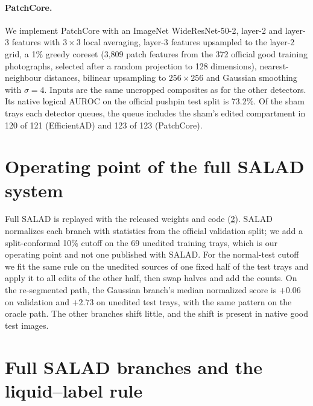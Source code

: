 \paragraph{PatchCore.} We implement PatchCore \cite{roth2022} with an ImageNet WideResNet-50-2, layer-2 and layer-3 features with $3{\times}3$ local averaging, layer-3 features upsampled to the layer-2 grid, a 1\% greedy coreset (3{,}809 patch features from the 372 official good training photographs, selected after a random projection to 128 dimensions), nearest-neighbour distances, bilinear upsampling to $256{\times}256$ and Gaussian smoothing with $\sigma=4$. Inputs are the same uncropped composites as for the other detectors. Its native logical AUROC on the official pushpin test split is 73.2\%. Of the sham trays each detector queues, the queue includes the sham's edited compartment in 120 of 121 (EfficientAD) and 123 of 123 (PatchCore).
\section{Operating point of the full SALAD system}
\label{sec:supp_full}
\begin{table}[t]
\centering
\caption{SALAD's full system on matched pushpin trays (re-segmented path; alarms out of 138). Native: logical AUROC (\%). The validation cutoff uses SALAD's validation-based normalization with a 10\% split-conformal cutoff; the normal-test cutoff is refit on one half of the unedited test trays and applied to the other.}
\label{tab:system}
\small\setlength{\tabcolsep}{1.9pt}

\end{table}
Full SALAD is replayed with the released weights and code (\cref{sec:supp_fusion}). SALAD normalizes each branch with statistics from the official validation split; we add a split-conformal 10\% cutoff on the 69 unedited training trays, which is our operating point and not one published with SALAD. For the normal-test cutoff we fit the same rule on the unedited sources of one fixed half of the test trays and apply it to all edits of the other half, then swap halves and add the counts. On the re-segmented path, the Gaussian branch's median normalized score is $+0.06$ on validation and $+2.73$ on unedited test trays, with the same pattern on the oracle path. The other branches shift little, and the shift is present in native good test images.
\section{Full SALAD branches and the liquid--label rule}
\label{sec:supp_fusion}
